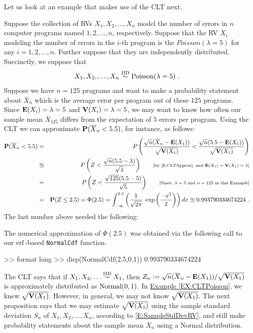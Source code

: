{Let us look at an example that makes use of the CLT next.
\begin{example}\label{EX:CLTPoisson}
Suppose the collection of RVs $X_1,X_2, \ldots, X_n$ model the number of errors in $n$ computer programs named $1,2,\ldots,n$, respectively.  Suppose that the RV $X_i$ modeling the number of errors in the $i$-th program is the $Poisson(\lambda=5)$ for any $i=1,2,\ldots,n$.  Further suppose that they are independently distributed.  Succinctly, we suppose that 
\[
X_1,X_2,\ldots,X_n \overset{{\rm IID}}{\sim} \mbox{{\rm Poisson}}(\lambda=5) \ . 
\]
Suppose we have $n=125$ programs and want to make a probability statement about $\overline{X}_n$ which is the average error per program out of these $125$ programs.  Since $\mathbf{E}(X_i) = \lambda=5$ and $\mathbf{V}(X_i)=\lambda=5$, we may want to know how often our sample mean $\overline{X}_{125}$ differs from the expectation of $5$ errors per program.  Using the CLT we can approximate $\mathbf{P}(\overline{X}_n < 5.5)$, for instance, as follows:
\begin{eqnarray}
\mathbf{P}(\overline{X}_n < 5.5) 
&=& P \left( \frac{\sqrt{n}(\overline{X}_n - \mathbf{E}(X_1))}{\sqrt{\mathbf{V}(X_1)}} < \frac{\sqrt{n}(5.5-\mathbf{E}(X_1))}{\sqrt{\mathbf{V}(X_1)}} \right) \notag \\
&\approxeq& P \left( Z < \frac{\sqrt{n}(5.5-\lambda)}{\sqrt{\lambda}} \right) \qquad \text{{\scriptsize [by \eqref{E:CLTApprox}, and $\mathbf{E}(X_1)=\mathbf{V}(X_1)=\lambda$]}} \notag \\
&=& P \left( Z < \frac{\sqrt{125}(5.5-5)}{\sqrt{5}} \right) \qquad \text{{\scriptsize [Since, $\lambda=5$ and $n=125$ in this Example]}} \notag \\
&=& \mathbf{P}(Z \leq 2.5) = \Phi(2.5) =  \int_{- \infty}^{2.5} \left( \frac{1}{\sqrt{2 \pi}} \ \exp \left( \frac{-x^2}{2} \right) \right) dx \approxeq 0.993790334674224 \ . \notag
\end{eqnarray}
The last number above needed the following:
\begin{labwork}
The numerical approximation of $\Phi(2.5)$ was obtained via the following call to our $\operatorname{erf}$-based {\tt NormalCdf} function. %
\begin{VrbM}
>> format long
>> disp(NormalCdf(2.5,0,1))
   0.993790334674224
\end{VrbM}
\end{labwork}
\end{example}
The CLT says that if $X_1,X_2,\ldots \overset{{\rm IID}}{\sim} X_1$, then $Z_n := \sqrt{n}(\overline{X}_n-\mathbf{E}(X_1))/\sqrt{\mathbf{V}(X_1)}$ is approximately distributed as $\mbox{{\rm Normal}}(0,1)$.  In \hyperref[EX:CLTPoisson]{Example \ref*{EX:CLTPoisson}}, we knew $\sqrt{\mathbf{V}(X_1)}$.   However, in general, we may not know $\sqrt{\mathbf{V}(X_1)}$.  The next proposition says that we may estimate $\sqrt{\mathbf{V}(X_1)}$ using the sample standard deviation $S_n$ of $X_1,X_2,\ldots,X_n$, according to \eqref{E:SampleStdDevRV}, and still make probability statements about the sample mean $\overline{X}_n$ using a Normal distribution.
}
